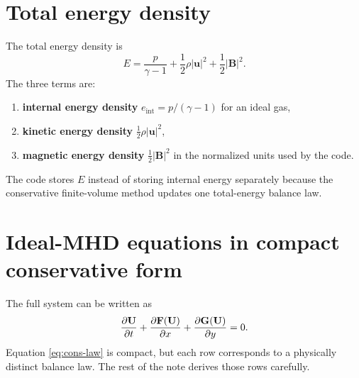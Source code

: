 \documentclass[11pt]{article}
\newcommand{\uvec}{\mathbf{u}}
\newcommand{\Bvec}{\mathbf{B}}
\newcommand{\Uvec}{\mathbf{U}}
\newcommand{\Fvec}{\mathbf{F}}
\newcommand{\Gvec}{\mathbf{G}}
\begin{document}
\section{Total energy density}
The total energy density is
\begin{equation}
E = \frac{p}{\gamma-1} + \frac{1}{2}\rho |\uvec|^2 + \frac{1}{2}|\Bvec|^2.
\label{eq:total-energy}
\end{equation}
The three terms are:
\begin{enumerate}[leftmargin=1.8em]
    \item \textbf{internal energy density} $e_{\mathrm{int}}=p/(\gamma-1)$ for an ideal gas,
    \item \textbf{kinetic energy density} $\frac12 \rho |\uvec|^2$,
    \item \textbf{magnetic energy density} $\frac12 |\Bvec|^2$ in the normalized units used by the code.
\end{enumerate}
The code stores $E$ instead of storing internal energy separately because the conservative finite-volume method updates one total-energy balance law.

\section{Ideal-MHD equations in compact conservative form}
The full system can be written as
\begin{equation}
\pdv{\Uvec}{t} + \pdv{\Fvec(\Uvec)}{x} + \pdv{\Gvec(\Uvec)}{y} = 0.
\label{eq:cons-law}
\end{equation}
Equation \eqref{eq:cons-law} is compact, but each row corresponds to a physically distinct balance law. The rest of the note derives those rows carefully.
\end{document}
